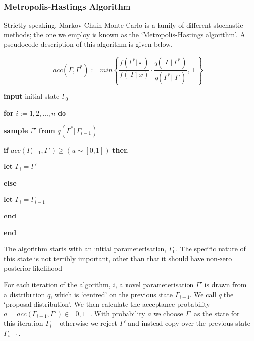 \documentclass[10pt,journal,compsoc]{IEEEtran}
\begin{document}
\subsubsection{Metropolis-Hastings Algorithm}

Strictly speaking, Markov Chain Monte Carlo is a family of different stochastic methods; the one we employ is known as the `Metropolis-Hastings algorithm'. A pseudocode description of this algorithm is given below.

\begin{equation*}
acc(\Gamma, \Gamma^*) := min\left\{\frac{f(\Gamma^*|\,x)}{f(\;\Gamma\,|\,x)} \cdot \frac{q(\;\Gamma\,|\,\Gamma^*)}{q(\Gamma^*|\;\Gamma\,)},\;1\,\right\}
\end{equation*}

\indent\textbf{input} initial state $\Gamma_0$

\indent\textbf{for} $i := 1, 2, \ldots , n$ \textbf{do}



\indent\indent\textbf{sample} $\Gamma'$ \textbf{from} $q(\Gamma^*|\,\Gamma_{i-1})$

\indent\indent\textbf{if} $acc(\Gamma_{i-1}, \Gamma') \ge (u \sim [0, 1])$ \textbf{then}

\indent\indent\indent\textbf{let} $\Gamma_i = \Gamma'$

\indent\indent\textbf{else}

\indent\indent\indent\textbf{let} $\Gamma_i = \Gamma_{i-1}$

\indent\indent\textbf{end}

\indent\textbf{end}

\vspace{0.5cm}

The algorithm starts with an initial parameterisation, $\Gamma_0$. The specific nature of this state is not terribly important, other than that it should have non-zero posterior likelihood.

For each iteration of the algorithm, $i$, a novel parameterisation $\Gamma'$ is drawn from a distribution $q$, which is `centred' on the previous state $\Gamma_{i-1}$. We call $q$ the `proposal distribution'. We then calculate the acceptance probability $a = acc(\Gamma_{i-1}, \Gamma') \in [0, 1]$. With probability $a$ we choose $\Gamma'$ as the state for this iteration $\Gamma_i$ -- otherwise we reject $\Gamma'$ and instead copy over the previous state $\Gamma_{i-1}$.
\end{document}
